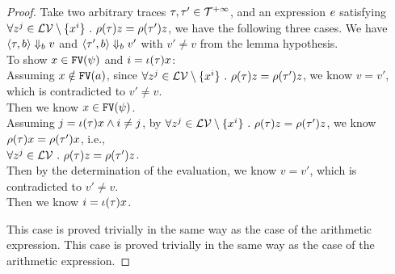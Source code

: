     \begin{proof}
		Take two arbitrary traces $\mathtt{\tau}, \mathtt{\tau}' \in \mathcal{T}^{+\infty}$, and an expression $e$ satisfying
		$ \forall z^j \in \mathcal{LV}  \setminus \{x^i\} ~.~  
		\rho(\mathtt{\tau}) z = \rho(\mathtt{\tau}') z $, we have the following three cases.
	We have $\langle \mathtt{\tau}, b \rangle \Downarrow_b v $ and 
	$\langle \mathtt{\tau}', b \rangle \Downarrow_b v' $ with $v' \neq v$ from the lemma hypothesis.
	\\
	To show $x \in \mathtt{FV}(\psi)$ and $i = \iota(\mathtt{\tau}) x$: 
	\\
	Assuming $x \notin \mathtt{FV}(a)$,
	since
	$ \forall z^j \in \mathcal{LV}  \setminus \{x^i\} ~.~  
		\rho(\mathtt{\tau}) z = \rho(\mathtt{\tau}') z $,
	we know $v = v'$, which is contradicted to $v' \neq v$.
	\\
	Then we know $x \in \mathtt{FV}(\psi)$.
	\\
	Assuming $j = \iota(\mathtt{\tau}) x \land i \neq j$,
	by 
	$ \forall z^j \in \mathcal{LV}  \setminus \{x^i\} ~.~  
		\rho(\mathtt{\tau}) z = \rho(\mathtt{\tau}') z $, we know 
		$\rho(\mathtt{\tau}) x = \rho(\mathtt{\tau}') x$, i.e., 
	\\
	$\forall z^j \in \mathcal{LV} ~.~  \rho(\mathtt{\tau}) z = \rho(\mathtt{\tau}') z$.
	\\
	Then by the determination of the evaluation, 
	we know $v = v'$, which is contradicted to $v' \neq v$.
	\\
	Then we know $i = \iota(\mathtt{\tau}) x$.

	This case is proved trivially in the same way as the case of the arithmetic expression.
	This case is proved trivially in the same way as the case of the arithmetic expression.
\end{proof}

